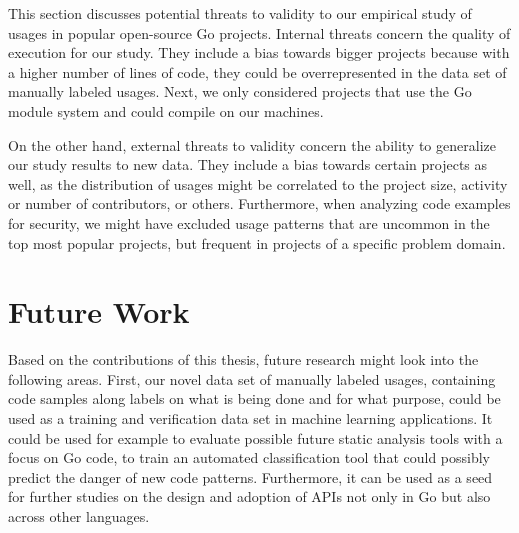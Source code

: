 This section discusses potential threats to validity to our empirical study of \unsafe{} usages in popular open-source
Go projects.
Internal threats concern the quality of execution for our study.
They include a bias towards bigger projects because with a higher number of lines of code, they could be
overrepresented in the data set of manually labeled \unsafe{} usages.
Next, we only considered projects that use the Go module system and could compile on our machines.

On the other hand, external threats to validity concern the ability to generalize our study results to new data.
They include a bias towards certain projects as well, as the distribution of \unsafe{} usages might be correlated to the
project size, activity or number of contributors, or others.
Furthermore, when analyzing \unsafe{} code examples for security, we might have excluded usage patterns that are
uncommon in the top \projsTotal{} most popular projects, but frequent in projects of a specific problem domain.



\section{Future Work}\label{sec:discussion:future-work}

Based on the contributions of this thesis, future research might look into the following areas.
First, our novel data set of manually labeled \unsafe{} usages, containing code samples along labels on what is being
done and for what purpose, could be used as a training and verification data set in machine learning applications.
It could be used for example to evaluate possible future static analysis tools with a focus on \unsafe{} Go code,
to train an automated classification tool that could possibly predict the danger of new \unsafe{} code patterns.
Furthermore, it can be used as a seed for further studies on the design and adoption of \unsafe{} APIs not only in Go
but also across other languages.

